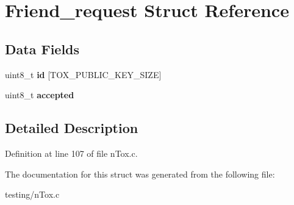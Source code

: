 \hypertarget{struct_friend__request}{\section{Friend\+\_\+request Struct Reference}
\label{struct_friend__request}
}
\subsection*{Data Fields}
\begin{DoxyCompactItemize}
\item 
\hypertarget{struct_friend__request_aca2bb72adf3445dbc7d501753fc2396d}{uint8\+\_\+t {\bfseries id} \mbox{[}T\+O\+X\+\_\+\+P\+U\+B\+L\+I\+C\+\_\+\+K\+E\+Y\+\_\+\+S\+I\+Z\+E\mbox{]}}\label{struct_friend__request_aca2bb72adf3445dbc7d501753fc2396d}

\item 
\hypertarget{struct_friend__request_a41a8f1919b834fd7e1d1e48aa06c09a8}{uint8\+\_\+t {\bfseries accepted}}\label{struct_friend__request_a41a8f1919b834fd7e1d1e48aa06c09a8}

\end{DoxyCompactItemize}


\subsection{Detailed Description}


Definition at line 107 of file n\+Tox.\+c.



The documentation for this struct was generated from the following file\+:\begin{DoxyCompactItemize}
\item 
testing/n\+Tox.\+c\end{DoxyCompactItemize}
